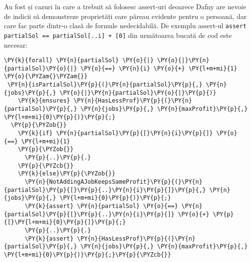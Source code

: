 \begin{enumerate}
Au fost și cazuri în care a trebuit să folosesc assert-uri deoarece Dafny are nevoie de indicii să demonstreze proprietăți care păreau evidente pentru o persoană, dar care fac parte dintr-o clasă de formule nedecidabilă. De exemplu assert-ul \texttt{assert partialSol == partialSol[..i] + [0]} din următoarea bucată de cod este necesar:
\begin{tiny}
\begin{Verbatim}[commandchars=\\\{\}, fontsize=\footnotesize]
\PY{k}{forall} \PY{n}{partialSol} \PY{o}{|} \PY{o}{|}\PY{n}{partialSol}\PY{o}{|} \PY{o}{==} \PY{n}{i} \PY{o}{+} \PY{l+m+mi}{1} \PY{o}{\PYZam{}\PYZam{}} 
 \PY{n}{isPartialSol}\PY{p}{(}\PY{n}{partialSol}\PY{p}{,} \PY{n}{jobs}\PY{p}{,} \PY{o}{|}\PY{n}{partialSol}\PY{o}{|}\PY{p}{)}
    \PY{k}{ensures} \PY{n}{HasLessProf}\PY{p}{(}\PY{n}{partialSol}\PY{p}{,} \PY{n}{jobs}\PY{p}{,} \PY{n}{maxProfit}\PY{p}{,} \PY{l+m+mi}{0}\PY{p}{)}\PY{p}{;}
  \PY{p}{\PYZob{}}
    \PY{k}{if} \PY{n}{partialSol}\PY{p}{[}\PY{n}{i}\PY{p}{]} \PY{o}{==} \PY{l+m+mi}{1}
    \PY{p}{\PYZob{}}
      \PY{p}{..}\PY{p}{.}
    \PY{p}{\PYZcb{}}
    \PY{k}{else}\PY{p}{\PYZob{}}
      \PY{n}{NotAddingAJobKeepsSameProfit}\PY{p}{(}\PY{n}{partialSol}\PY{p}{[}\PY{p}{..}\PY{n}{i}\PY{p}{]}\PY{p}{,} \PY{n}{jobs}\PY{p}{,} \PY{l+m+mi}{0}\PY{p}{)}\PY{p}{;}
      \PY{k}{assert} \PY{n}{partialSol} \PY{o}{==} \PY{n}{partialSol}\PY{p}{[}\PY{p}{..}\PY{n}{i}\PY{p}{]} \PY{o}{+} \PY{p}{[}\PY{l+m+mi}{0}\PY{p}{]}\PY{p}{;}
      \PY{p}{..}\PY{p}{.}
      \PY{k}{assert} \PY{n}{HasLessProf}\PY{p}{(}\PY{n}{partialSol}\PY{p}{,} \PY{n}{jobs}\PY{p}{,} \PY{n}{maxProfit}\PY{p}{,} \PY{l+m+mi}{0}\PY{p}{)}\PY{p}{;}\PY{p}{\PYZcb{}}
\end{Verbatim}
\end{tiny}
\end{enumerate}


















